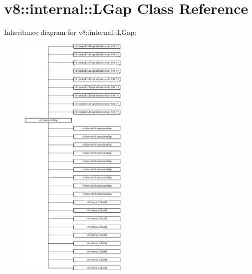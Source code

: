 \hypertarget{classv8_1_1internal_1_1_l_gap}{}\section{v8\+:\+:internal\+:\+:L\+Gap Class Reference}
\label{classv8_1_1internal_1_1_l_gap}
Inheritance diagram for v8\+:\+:internal\+:\+:L\+Gap\+:\begin{figure}[H]
\begin{center}
\leavevmode
\includegraphics[height=12.000000cm]{classv8_1_1internal_1_1_l_gap}
\end{center}
\end{figure}
